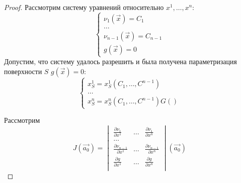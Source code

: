 \documentclass[a4paper, 12pt]{article}
\begin{document}
\begin{proof}
        Рассмотрим систему уравнений относительно $x^1, \dots, x^n$:
        \begin{equation}
            \begin{cases}
                \nu_1(\overrightarrow{x}) = C_1             \\
                \dots                                       \\
                \nu_{n - 1}(\overrightarrow{x}) = C_{n - 1} \\
                g(\overrightarrow{x}) = 0
            \end{cases}
            \label{part_eq_5}
        \end{equation}
        Допустим, что систему удалось разрешить и была получена параметризация поверхности $S$ $g(\overrightarrow{x}) = 0$:
        \begin{equation*}
            \begin{cases}
                x^1_S = x^1_S(C_1, \dots, C^{n - 1}) \\
                \dots                                \\
                x^n_S = x^n_S(C_1, \dots, C^{n - 1})
                G()
            \end{cases}
        \end{equation*}

        Рассмотрим
        \begin{equation*}
            J(\overrightarrow{a_0}) =
            \begin{vmatrix}
                \frac{\partial \nu_1}{\partial x^1} & \dots & \frac{\partial \nu_1}{\partial x^n}             \\
                \dots                                                                                         \\
                \frac{\partial \nu_{n - 1}}{\partial x^1} & \dots & \frac{\partial \nu_{n - 1}}{\partial x^n} \\
                \frac{\partial g}{\partial x^1} & \dots & \frac{\partial g}{\partial x^n}                     \\
            \end{vmatrix} (\overrightarrow{a_0})
        \end{equation*}


\end{proof}
\end{document}
